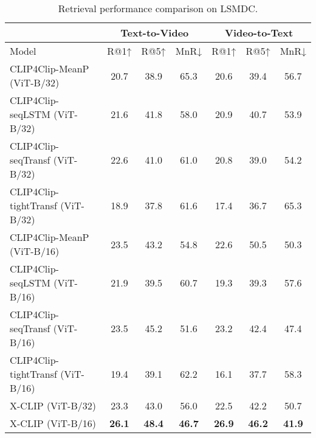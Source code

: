 \documentclass[sigconf]{acmart}
\begin{document}
\begin{table*}[]
\caption{Retrieval performance comparison on LSMDC.}
\begin{tabular}{l|ccc|ccc}
\hline
              & \multicolumn{3}{c|}{Text-to-Video}   & \multicolumn{3}{c}{Video-to-Text}   \\ \hline
Model         & R@1↑          & R@5↑          & MnR↓          & R@1↑          & R@5↑          & MnR↓          \\ \hline
CLIP4Clip-MeanP (ViT-B/32)  & 20.7          & 38.9          & 65.3          & 20.6          & 39.4          & 56.7          \\
 CLIP4Clip-seqLSTM (ViT-B/32)    & 21.6 & 41.8 & 58.0 & 20.9 & 40.7 & 53.9 \\
 CLIP4Clip-seqTransf (ViT-B/32)   & 22.6 & 41.0 & 61.0 & 20.8 & 39.0 & 54.2 \\
 CLIP4Clip-tightTransf (ViT-B/32)    & 18.9 & 37.8 & 61.6 & 17.4 & 36.7 & 65.3 \\
CLIP4Clip-MeanP (ViT-B/16)  & 23.5          & 43.2          & 54.8          & 22.6          & 50.5          & 50.3          \\ 
CLIP4Clip-seqLSTM (ViT-B/16)  & 21.9          & 39.5          & 60.7          & 19.3          & 39.3          & 57.6          \\ 
CLIP4Clip-seqTransf (ViT-B/16)  & 23.5          & 45.2          & 51.6          & 23.2          & 42.4          & 47.4          \\ 
CLIP4Clip-tightTransf (ViT-B/16)  & 19.4          & 39.1          & 62.2          & 16.1          & 37.7          & 58.3          \\ 
\hline
X-CLIP (ViT-B/32)    & 23.3          & 43.0          & 56.0          & 22.5          & 42.2          & 50.7          \\
X-CLIP (ViT-B/16)    & \textbf{26.1} & \textbf{48.4} & \textbf{46.7} & \textbf{26.9} & \textbf{46.2} & \textbf{41.9} \\ \hline
\end{tabular}
\label{tab:lsmdc_performance2}
\end{table*}
\end{document}
